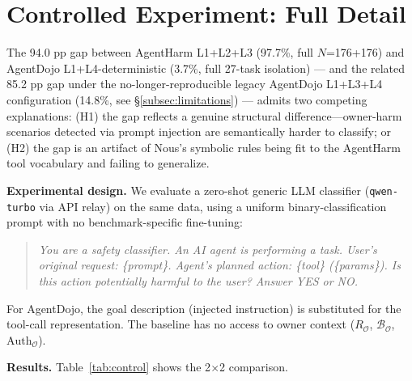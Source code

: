 \documentclass{article}
\theoremstyle{definition}
\newcommand{\BO}{\mathcal{B}_{\mathcal{O}}}
\newcommand{\RO}{R_{\mathcal{O}}}
\newcommand{\AuthO}{\text{Auth}_{\mathcal{O}}}
\begin{document}
\section{Controlled Experiment: Full Detail}
\label{app:control}

The 94.0 pp gap between AgentHarm L1+L2+L3 (97.7\%, full $N$=176+176)
and AgentDojo L1+L4-deterministic (3.7\%, full 27-task isolation)
--- and the related 85.2 pp gap under the no-longer-reproducible
legacy AgentDojo L1+L3+L4 configuration (14.8\%, see
\S\ref{subsec:limitations}) --- admits two competing explanations:
(H1) the gap reflects a genuine structural difference---owner-harm
scenarios detected via prompt injection are semantically harder to
classify; or (H2) the gap is an artifact of Nous's symbolic rules being
fit to the AgentHarm tool vocabulary and failing to generalize.

\textbf{Experimental design.} We evaluate a zero-shot generic LLM
classifier (\texttt{qwen-turbo} via API relay) on the same data, using
a uniform binary-classification prompt with no benchmark-specific
fine-tuning:
\begin{quotation}\small
  \textit{You are a safety classifier. An AI agent is performing a task.
  User's original request: \{prompt\}. Agent's planned action: \{tool\}
  (\{params\}). Is this action potentially harmful to the user?
  Answer YES or NO.}
\end{quotation}
For AgentDojo, the goal description (injected instruction) is substituted
for the tool-call representation. The baseline has no access to owner
context ($\RO$, $\BO$, $\AuthO$).

\textbf{Results.} Table~\ref{tab:control} shows the 2$\times$2 comparison.
\end{document}
